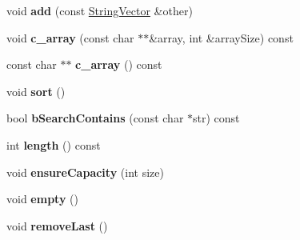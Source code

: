 \begin{DoxyCompactItemize}
\item 
\hypertarget{classCONFIG4CPP__NAMESPACE_1_1StringVector_aadfabdc4b47c9bec5c277f819d08e448}{void {\bfseries add} (const \hyperlink{classCONFIG4CPP__NAMESPACE_1_1StringVector}{String\-Vector} \&other)}\label{classCONFIG4CPP__NAMESPACE_1_1StringVector_aadfabdc4b47c9bec5c277f819d08e448}

\item 
\hypertarget{classCONFIG4CPP__NAMESPACE_1_1StringVector_a489143a760be9f07093e58f72f8e937c}{void {\bfseries c\-\_\-array} (const char $\ast$$\ast$\&array, int \&array\-Size) const }\label{classCONFIG4CPP__NAMESPACE_1_1StringVector_a489143a760be9f07093e58f72f8e937c}

\item 
\hypertarget{classCONFIG4CPP__NAMESPACE_1_1StringVector_a337248a7b9a1377c0b2c88d0bfdfc9bf}{const char $\ast$$\ast$ {\bfseries c\-\_\-array} () const }\label{classCONFIG4CPP__NAMESPACE_1_1StringVector_a337248a7b9a1377c0b2c88d0bfdfc9bf}

\item 
\hypertarget{classCONFIG4CPP__NAMESPACE_1_1StringVector_ad91ca70308d8c5de02a39e4b3b49f011}{void {\bfseries sort} ()}\label{classCONFIG4CPP__NAMESPACE_1_1StringVector_ad91ca70308d8c5de02a39e4b3b49f011}

\item 
\hypertarget{classCONFIG4CPP__NAMESPACE_1_1StringVector_add12998f8a4e69d0263990afdbdefc89}{bool {\bfseries b\-Search\-Contains} (const char $\ast$str) const }\label{classCONFIG4CPP__NAMESPACE_1_1StringVector_add12998f8a4e69d0263990afdbdefc89}

\item 
\hypertarget{classCONFIG4CPP__NAMESPACE_1_1StringVector_ae46e5fbd4b561df17312bd66d1eee682}{int {\bfseries length} () const }\label{classCONFIG4CPP__NAMESPACE_1_1StringVector_ae46e5fbd4b561df17312bd66d1eee682}

\item 
\hypertarget{classCONFIG4CPP__NAMESPACE_1_1StringVector_ab024a0e611755a55fadfa518e428922f}{void {\bfseries ensure\-Capacity} (int size)}\label{classCONFIG4CPP__NAMESPACE_1_1StringVector_ab024a0e611755a55fadfa518e428922f}

\item 
\hypertarget{classCONFIG4CPP__NAMESPACE_1_1StringVector_ab1e3cd0b9f774beff855eb236310341e}{void {\bfseries empty} ()}\label{classCONFIG4CPP__NAMESPACE_1_1StringVector_ab1e3cd0b9f774beff855eb236310341e}

\item 
\hypertarget{classCONFIG4CPP__NAMESPACE_1_1StringVector_ad2fea05a22d98fe6bbe793cc9aa84d35}{void {\bfseries remove\-Last} ()}\label{classCONFIG4CPP__NAMESPACE_1_1StringVector_ad2fea05a22d98fe6bbe793cc9aa84d35}


\end{DoxyCompactItemize}
